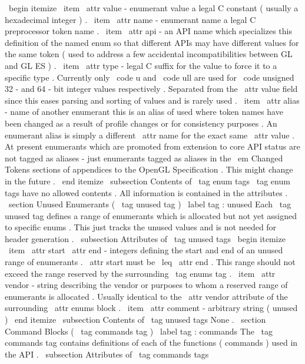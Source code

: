 \
begin
{
itemize
}
\
item
\
attr
{
value
}
-
enumerant
value
a
legal
C
constant
(
usually
a
hexadecimal
integer
)
.
\
item
\
attr
{
name
}
-
enumerant
name
a
legal
C
preprocessor
token
name
.
\
item
\
attr
{
api
}
-
an
API
name
which
specializes
this
definition
of
the
named
enum
so
that
different
APIs
may
have
different
values
for
the
same
token
(
used
to
address
a
few
accidental
incompatibilities
between
GL
and
GL
ES
)
.
\
item
\
attr
{
type
}
-
legal
C
suffix
for
the
value
to
force
it
to
a
specific
type
.
Currently
only
\
code
{
u
}
and
\
code
{
ull
}
are
used
for
\
code
{
unsigned
}
32
-
and
64
-
bit
integer
values
respectively
.
Separated
from
the
\
attr
{
value
}
field
since
this
eases
parsing
and
sorting
of
values
and
is
rarely
used
.
\
item
\
attr
{
alias
}
-
name
of
another
enumerant
this
is
an
alias
of
used
where
token
names
have
been
changed
as
a
result
of
profile
changes
or
for
consistency
purposes
.
An
enumerant
alias
is
simply
a
different
\
attr
{
name
}
for
the
exact
same
\
attr
{
value
}
.
At
present
enumerants
which
are
promoted
from
extension
to
core
API
status
are
not
tagged
as
aliases
-
just
enumerants
tagged
as
aliases
in
the
{
\
em
Changed
Tokens
}
sections
of
appendices
to
the
OpenGL
Specification
.
This
might
change
in
the
future
.
\
end
{
itemize
}
\
subsection
{
Contents
of
\
tag
{
enum
}
tags
}
\
tag
{
enum
}
tags
have
no
allowed
contents
.
All
information
is
contained
in
the
attributes
.
\
section
{
Unused
Enumerants
(
\
tag
{
unused
}
tag
)
}
\
label
{
tag
:
unused
}
Each
\
tag
{
unused
}
tag
defines
a
range
of
enumerants
which
is
allocated
but
not
yet
assigned
to
specific
enums
.
This
just
tracks
the
unused
values
and
is
not
needed
for
header
generation
.
\
subsection
{
Attributes
of
\
tag
{
unused
}
tags
}
\
begin
{
itemize
}
\
item
\
attr
{
start
}
\
attr
{
end
}
-
integers
defining
the
start
and
end
of
an
unused
range
of
enumerants
.
\
attr
{
start
}
must
be
\
leq
\
attr
{
end
}
.
This
range
should
not
exceed
the
range
reserved
by
the
surrounding
\
tag
{
enums
}
tag
.
\
item
\
attr
{
vendor
}
-
string
describing
the
vendor
or
purposes
to
whom
a
reserved
range
of
enumerants
is
allocated
.
Usually
identical
to
the
\
attr
{
vendor
}
attribute
of
the
surrounding
\
attr
{
enums
}
block
.
\
item
\
attr
{
comment
}
-
arbitrary
string
(
unused
)
\
end
{
itemize
}
\
subsection
{
Contents
of
\
tag
{
unused
}
tags
}
None
.
\
section
{
Command
Blocks
(
\
tag
{
commands
}
tag
)
}
\
label
{
tag
:
commands
}
The
\
tag
{
commands
}
tag
contains
definitions
of
each
of
the
functions
(
commands
)
used
in
the
API
.
\
subsection
{
Attributes
of
\
tag
{
commands
}
tags
}
